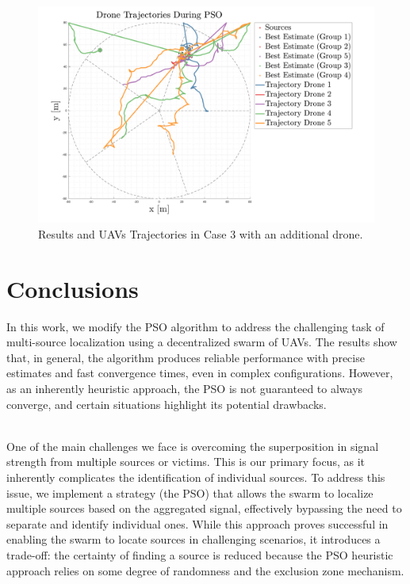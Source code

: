 \begin{figure}
    \centering
    \includegraphics[width=1.06\textwidth]{images/case_3.pdf}
    \caption[PSO Case 3]{Results and UAVs Trajectories in Case 3 with an additional drone.}
    \label{fig:case3}
\end{figure}


\section{Conclusions}
In this work, we modify the PSO algorithm to address the challenging
task of multi-source localization using a decentralized swarm of UAVs.
The results show that, in general, the algorithm produces reliable
performance with precise estimates and fast convergence times, even in
complex configurations. However, as an inherently heuristic approach,
the PSO is not guaranteed to always converge, and certain situations
highlight its potential drawbacks.

\noindent\\
One of the main challenges we face is overcoming the superposition in
signal strength from multiple sources or victims. This is our primary
focus, as it inherently complicates the identification of individual
sources. To address this issue, we implement a strategy (the PSO) that
allows the swarm to localize multiple sources based on the aggregated
signal, effectively bypassing the need to separate and identify
individual ones. While this approach proves successful in enabling the
swarm to locate sources in challenging scenarios, it introduces a
trade-off: the certainty of finding a source is reduced because the PSO
heuristic approach relies on some degree of randomness and the exclusion
zone mechanism.

